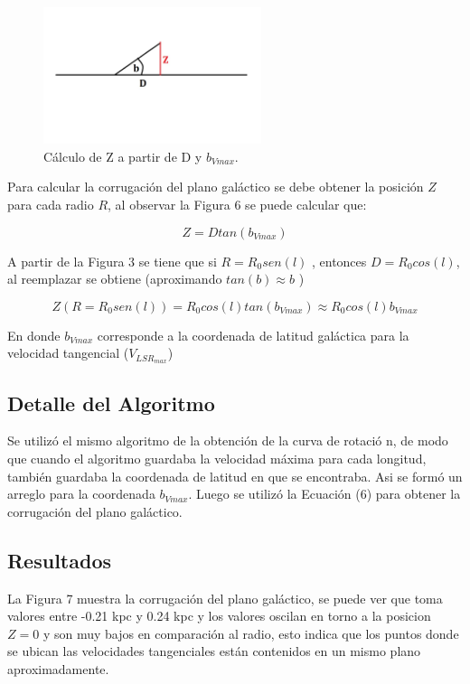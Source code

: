 \documentclass[letterpaper,oneside]{article}
\begin{document}
\begin{figure}
  \centering
  \includegraphics[height=4cm]{../graficos/imagenes/Corrugacion.jpg}
  \caption{Cálculo de Z a partir de D y $b_{Vmax}$.}
\end{figure}

Para calcular la corrugación del plano galáctico se debe obtener la posición $Z$ para cada radio $R$, al observar la Figura 6 se puede calcular que:

$$Z = D tan(b_{Vmax})$$

A partir de la Figura 3 se tiene que si $R = R_0 sen(l)$ , entonces $D = R_0 cos(l)$, al reemplazar se obtiene (aproximando $tan(b) \approx b $ )

\begin{equation}
    Z(R=R_0 sen(l)) = R_0 cos(l) tan(b_{Vmax}) \approx R_0 cos(l) b_{Vmax}
\end{equation}

En donde $b_{Vmax}$ corresponde a la coordenada de latitud galáctica para la velocidad tangencial ($V_{LSR}_{max}$)

\subsection{Detalle del Algoritmo}
Se utilizó el mismo algoritmo de la obtención de la curva de rotació
n, de modo que cuando el algoritmo guardaba la velocidad máxima para cada longitud, también guardaba la coordenada de latitud en que se encontraba. Asi se formó un arreglo para la coordenada $b_{Vmax}$. Luego se utilizó la Ecuación (6) para obtener la corrugación del plano galáctico.

\subsection{Resultados}
La Figura 7 muestra la corrugación del plano galáctico, se puede ver que toma valores entre -0.21 kpc y 0.24 kpc y los valores oscilan en torno a la posicion $Z=0$ y son muy bajos en comparación al radio, esto indica que los puntos donde se ubican las velocidades tangenciales están contenidos en un mismo plano aproximadamente.
\end{document}
